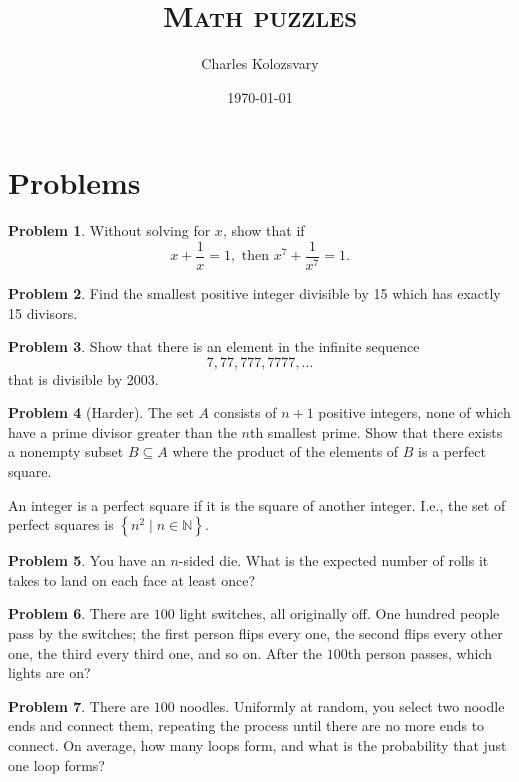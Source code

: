 \documentclass{article}
\title{\textsc{Math puzzles}}
\author{Charles Kolozsvary}
\date{\today}
\theoremstyle{definition}
\newtheorem{prob}{Problem}
\theoremstyle{plain}
\newcommand{\set}[1]{\left\{#1\right\}}
\begin{document}
\maketitle

\section{Problems}
\begin{prob}
Without solving for $x$, show that if
\[
x + \frac{1}{x} = 1, \text{ then } x^7 + \frac{1}{x^7} = 1.
\]
\end{prob}

\begin{prob}
Find the smallest positive integer divisible by 15 which has exactly 15 divisors.
\end{prob}

\begin{prob}
Show that there is an element in the infinite sequence
\[
7, 77, 777, 7777, \ldots
\]
that is divisible by 2003.
\end{prob}

\begin{prob}[Harder]\label{prob:f2n}
The set $A$ consists of $n+1$ positive integers, none of which have a prime divisor greater than the $n$th smallest prime. Show that there exists a nonempty subset $B \subseteq A$ where the product of the elements of $B$ is a perfect square.

An integer is a perfect square if it is the square of another integer. I.e., the set of perfect squares is $\set{n^2 \mid n \in \mathbb{N}}$.
\end{prob}

\begin{prob}
You have an $n$-sided die. What is the expected number of rolls it takes to land on each face at least once?
\end{prob}

\begin{prob}
There are $100$ light switches, all originally off. One hundred people pass by the switches; the first person flips every one, the second flips every other one, the third every third one, and so on. After the $100$th person passes, which lights are on?
\end{prob}

\begin{prob}
There are $100$ noodles. Uniformly at random, you select two noodle ends and connect them, repeating the process until there are no more ends to connect. On average, how many loops form, and what is the probability that just one loop forms? 
\end{prob}
\end{document}
